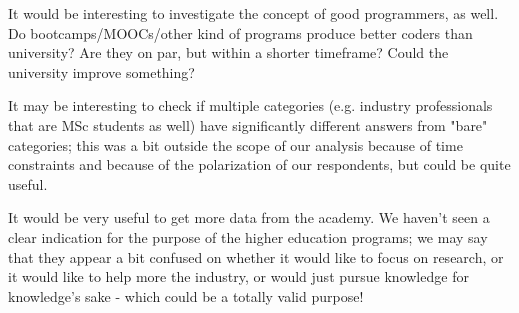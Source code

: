 \documentclass{sigchi}
\begin{document}
It would be interesting to investigate the concept of good programmers, as well. Do bootcamps/MOOCs/other kind of programs produce better coders than university? Are they on par, but within a shorter timeframe? Could the university improve something?

It may be interesting to check if multiple categories (e.g. industry professionals that are MSc students as well) have significantly different answers from "bare" categories; this was a bit outside the scope of our analysis because of time constraints and because of the polarization of our respondents, but could be quite useful.

It would be very useful to get more data from the academy. We haven't seen a clear indication for the purpose of the higher education programs; we may say that they appear a bit confused on whether it would like to focus on research, or it would like to help more the industry, or would just pursue knowledge for knowledge's sake - which could be a totally valid purpose!





\balance{}

\balance{}



\end{document}
